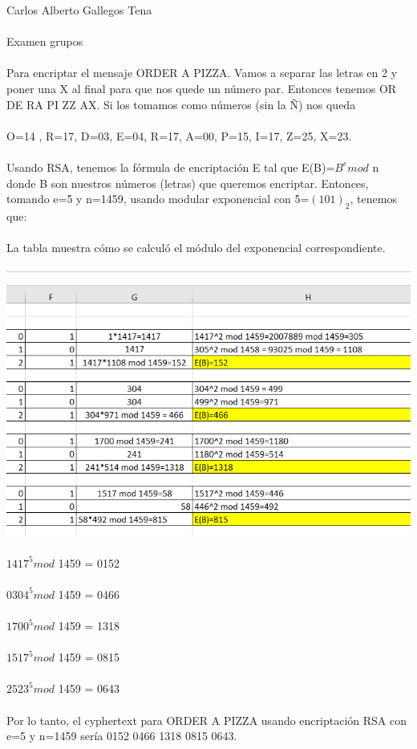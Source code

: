 \documentclass[a4paper,10pt]{article}
\title{}
\author{}
\date{}
\begin{document}
\maketitle
Carlos Alberto Gallegos Tena \\\\
Examen grupos\\\\
Para encriptar el mensaje ORDER A  PIZZA. Vamos a separar las letras en 2 y poner una X al final para que nos quede un número par. Entonces tenemos OR DE RA PI ZZ AX. Si los tomamos como números (sin la Ñ) nos queda \\\\
O=14 , R=17, D=03, E=04, R=17, A=00, P=15, I=17, Z=25, X=23.\\\\
Usando RSA, tenemos la fórmula de encriptación E tal que E(B)=$B^e mod$ n donde B son nuestros números (letras) que queremos encriptar. Entonces, tomando e=5 y n=1459, usando modular exponencial con 5=$(101)_2$, tenemos que:\\\\
La tabla muestra cómo se calculó el módulo del exponencial correspondiente.\\\\
\includegraphics[scale=.8]{Captura de pantalla (53).png}\\\\
$1417^5 mod$  1459 = 0152\\\\
$0304^5 mod$  1459 = 0466\\\\
$1700^5 mod$  1459 = 1318\\\\
$1517^5 mod$  1459 = 0815\\\\
$2523^5 mod$  1459 = 0643\\\\

Por lo tanto, el cyphertext para ORDER A  PIZZA usando encriptación RSA con e=5 y n=1459 sería 0152 0466 1318 0815 0643.
\end{document}
